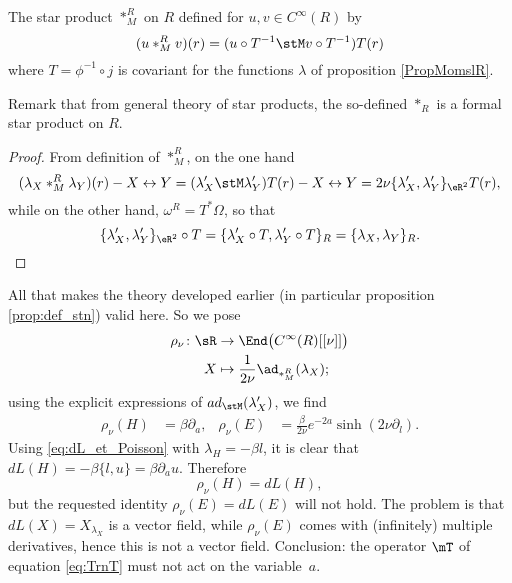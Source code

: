 \begin{corollary}
The star product $\ast_M^R$ on $R$ defined for $u,v\in C^{\infty}(R)$ by
\begin{equation}
  (u\ast_M^R v)(r)=( u\circ T^{-1}\stM v\circ T^{-1} )T(r)
\end{equation}
where $T=\phi^{-1}\circ j$ is covariant for the functions $\lambda$ of proposition \ref{PropMomslR}.

\end{corollary}
Remark that from general theory of star products, the so-defined $\ast_R$ is a formal star product on $R$.

\begin{proof}
From definition of $\ast_M^R$, on the one hand
\[ 
  (\lambda_X\ast_M^R \lambda_Y)(r)-X\leftrightarrow Y=(\lambda'_X\stM\lambda'_Y)T(r)-X\leftrightarrow Y
=2\nu\{  \lambda'_X,\lambda'_Y \}_{\eR^2}T(r),
\]
while on the other hand, $\omega^R=T^*\Omega$, so that 
\[ 
  \{ \lambda'_X,\lambda'_Y \}_{\eR^2}\circ T=\{ \lambda'_X\circ T,\lambda'_Y\circ T \}_R=\{ \lambda_X,\lambda_Y \}_R.
\]

\end{proof}

All that makes the theory developed earlier (in particular proposition \ref{prop:def_stn}) valid here. So we pose
\begin{equation}
\begin{aligned}
 {\rho_{\nu}}\colon\sR &\to {\End\big(  C^{\infty}(R)[ [\nu]] \big)} \\ 
  X &\mapsto {\frac{1}{2\nu}\ad_{\ast_M^R}(\lambda_X);} 
\end{aligned}
\end{equation}
using the explicit expressions of $ad_{\stM}(\lambda'_X)$, we find
\begin{align}
  \rho_{\nu}(H)&=\beta\partial_a,	&\rho_{\nu}(E)&=\frac{\beta}{2\nu}e^{-2a}\sinh(2\nu\partial_l).
\end{align}
Using \eqref{eq:dL_et_Poisson} with $\lambda_H=-\beta l$, it is clear that $dL(H)=-\beta\{l,u\}=\beta\partial_a u$. Therefore
\begin{equation}
   \rho_{\nu}(H)=dL(H),
\end{equation}
but the requested identity $\rho_{\nu}(E)=dL(E)$ will not hold. The problem is that $dL(X)=X_{\lambda_X}$ is a vector field, while $\rho_{\nu}(E)$ comes with (infinitely) multiple derivatives, hence this is not a vector field. Conclusion: the operator $\mT$ of equation \eqref{eq:TrnT} must not act on the variable~$a$.

